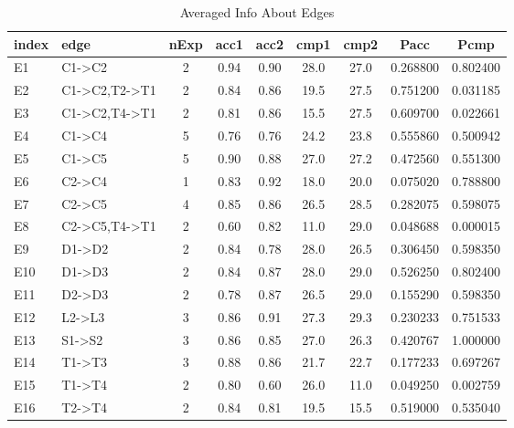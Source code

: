 \begin{table*}\begin{small}\begin{center}\caption{Averaged Info About Edges}\label{table:testedEdgesTable}\begin{tabular}
{llccccccc}
index & edge & nExp & acc1 & acc2 & cmp1 & cmp2 & Pacc & Pcmp \\
\toprule[0.16em]
E1 & C1->C2 & 2 & 0.94 & 0.90 & 28.0 & 27.0 & 0.268800 & 0.802400\\
E2 & C1->C2,T2->T1 & 2 & 0.84 & 0.86 & 19.5 & 27.5 & 0.751200 & 0.031185\\
E3 & C1->C2,T4->T1 & 2 & 0.81 & 0.86 & 15.5 & 27.5 & 0.609700 & 0.022661\\
E4 & C1->C4 & 5 & 0.76 & 0.76 & 24.2 & 23.8 & 0.555860 & 0.500942\\
E5 & C1->C5 & 5 & 0.90 & 0.88 & 27.0 & 27.2 & 0.472560 & 0.551300\\
E6 & C2->C4 & 1 & 0.83 & 0.92 & 18.0 & 20.0 & 0.075020 & 0.788800\\
E7 & C2->C5 & 4 & 0.85 & 0.86 & 26.5 & 28.5 & 0.282075 & 0.598075\\
E8 & C2->C5,T4->T1 & 2 & 0.60 & 0.82 & 11.0 & 29.0 & 0.048688 & 0.000015\\
E9 & D1->D2 & 2 & 0.84 & 0.78 & 28.0 & 26.5 & 0.306450 & 0.598350\\
E10 & D1->D3 & 2 & 0.84 & 0.87 & 28.0 & 29.0 & 0.526250 & 0.802400\\
E11 & D2->D3 & 2 & 0.78 & 0.87 & 26.5 & 29.0 & 0.155290 & 0.598350\\
E12 & L2->L3 & 3 & 0.86 & 0.91 & 27.3 & 29.3 & 0.230233 & 0.751533\\
E13 & S1->S2 & 3 & 0.86 & 0.85 & 27.0 & 26.3 & 0.420767 & 1.000000\\
E14 & T1->T3 & 3 & 0.88 & 0.86 & 21.7 & 22.7 & 0.177233 & 0.697267\\
E15 & T1->T4 & 2 & 0.80 & 0.60 & 26.0 & 11.0 & 0.049250 & 0.002759\\
E16 & T2->T4 & 2 & 0.84 & 0.81 & 19.5 & 15.5 & 0.519000 & 0.535040\\
\bottomrule[0.13em]\end{tabular}\end{center}\end{small}\end{table*}
